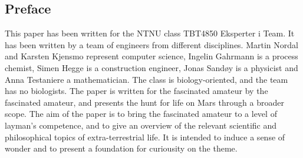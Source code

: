 \subsection*{Preface}

This paper has been written for the NTNU class TBT4850 Eksperter i Team. It has been written by a team of engineers from different disciplines. Martin Nordal and Karsten Kjensmo represent computer science, Ingelin Gahrmann is a process chemist, Simen Hegge is a construction engineer, Jonas Sandøy is a physicist and Anna Testaniere a mathematician. The class is biology-oriented, and the team has no biologists. The paper is written for the fascinated amateur by the fascinated amateur, and presents the hunt for life on Mars through a broader scope. The aim of the paper is to bring the fascinated amateur to a level of layman's competence, and to give an overview of the relevant scientific and philosophical topics of extra-terrestrial life. It is intended to induce a sense of wonder and to present a foundation for curiousity on the theme.
